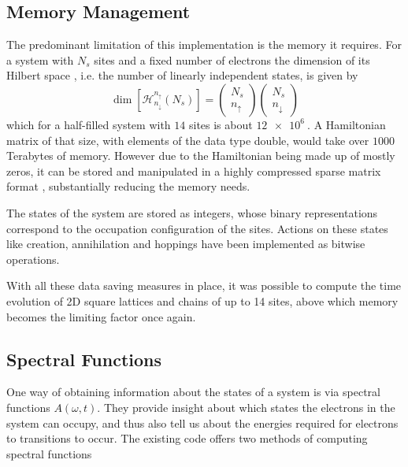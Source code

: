 \subsection{Memory Management}
The predominant limitation of this implementation is the memory it requires. For a system with $N_s$ sites and a fixed number of electrons the dimension of its Hilbert space , i.e. the number of linearly independent states, is given by 
\begin{equation}
    \dim \left[\mathcal{H}^{n_\uparrow}_{n_\downarrow} (N_s)\right] = \begin{pmatrix}N_s \\ n_\uparrow\end{pmatrix} \begin{pmatrix}N_s \\ n_\downarrow\end{pmatrix}
\end{equation}
which for a half-filled system with $14$ sites is about $\SI{12e6}{}$. A Hamiltonian matrix of that size, with elements of the data type double, would take over $1000$ Terabytes of memory. However due to the Hamiltonian being made up of mostly zeros, it can be stored and manipulated in a highly compressed sparse matrix format \cite{innerberger}, substantially reducing the memory needs.
\medskip

The states of the system are stored as integers, whose binary representations correspond to the occupation configuration of the sites. Actions on these states like creation, annihilation and hoppings have been implemented as bitwise operations.
\medskip
 
With all these data saving measures in place, it was possible to compute the time evolution of 2D square lattices and chains of up to 14 sites, above which memory becomes the limiting factor once again.


\subsection{Spectral Functions}\label{sec:spectral_functions}

One way of obtaining information about the states of a system is via spectral functions $A(\omega, t)$. They provide insight about which states the electrons in the system can occupy, and thus also tell us about the energies required for electrons to transitions to occur. The existing code offers two methods of computing spectral functions \cite{spectral_function}

